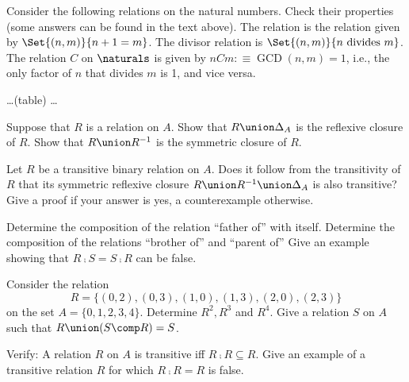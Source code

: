 \documentclass{report}
\begin{document}
\begin{Exercise} [number=33]
  Consider the following relations on the natural numbers. Check their
  properties (some answers can be found in the text above). The
   relation is the relation given by
  $\Set{(n,m)}{n+1=m}$. The divisor relation is $\Set{(n,m)}{n
    \textrm{ divides } m}$. The  relation $C$ on
  $\naturals$ is given by $nCm :\equiv \operatorname{GCD}(n,m) = 1$,
  i.e., the only factor of $n$ that divides $m$ is 1, and vice versa.

  \dots (table) \dots
\end{Exercise}

\begin{Exercise} [number=35]
  Suppose that $R$ is a relation on $A$.
  \Question Show that $R \union \Delta_A$ is the reflexive closure of
  $R$.
  \Question Show that $R \union R^{-1}$ is the symmetric closure of $R$.
\end{Exercise}

\begin{Exercise} [number=36]
  Let $R$ be a transitive binary relation on $A$. Does it follow from
  the transitivity of $R$ that its symmetric reflexive closure $R
  \union R^{-1} \union \Delta_A$ is also transitive? Give a proof if
  your answer is yes, a counterexample otherwise.
\end{Exercise}

\begin{Exercise} [number=38]
  Determine the composition of the relation ``father of'' with
  itself. Determine the composition of the relations ``brother of''
  and ``parent of'' Give an example showing that $R \comp S = S \comp
  R$ can be false.
\end{Exercise}

\begin{Exercise} [number=39]
  Consider the relation \[R =
  \{(0,2),(0,3),(1,0),(1,3),(2,0),(2,3)\}\] on the set $A =
  \{0,1,2,3,4\}$.
  \Question Determine $R^2, R^3$ and $R^4$.
  \Question Give a relation $S$ on $A$ such that $R \union (S \comp R)
  = S$.
\end{Exercise}

\begin{Exercise} [number=40]
  Verify:
  \Question A relation $R$ on $A$ is transitive iff $R \comp R
  \subseteq R$.
  \Question Give an example of a transitive relation $R$ for which $R
  \comp R = R$ is false.
\end{Exercise}
\end{document}
